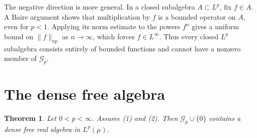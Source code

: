 \documentclass[11pt]{article}
\newtheorem{theorem}{Theorem}
\newcommand{\cG}{\mathcal G}
\begin{document}
The negative direction is more general.  In a closed subalgebra $A\subset
L^p$, fix $f\in A$.  A Baire argument shows that multiplication by $f$ is a
bounded operator on $A$, even for $p<1$.  Applying its norm estimate to the
powers $f^n$ gives a uniform bound on $\|f\|_{np}$ as $n\to\infty$, which
forces $f\in L^\infty$.  Thus every closed $L^p$ subalgebra consists entirely
of bounded functions and cannot have a nonzero member of $\cG_p$.

\section{The dense free algebra}

\begin{theorem}\label{thm:dense}
Let $0<p<\infty$.  Assume (1) and (2).  Then
$\cG_p\cup\{0\}$ contains a dense free real algebra in $L^p(\mu)$.
\end{theorem}
\end{document}
